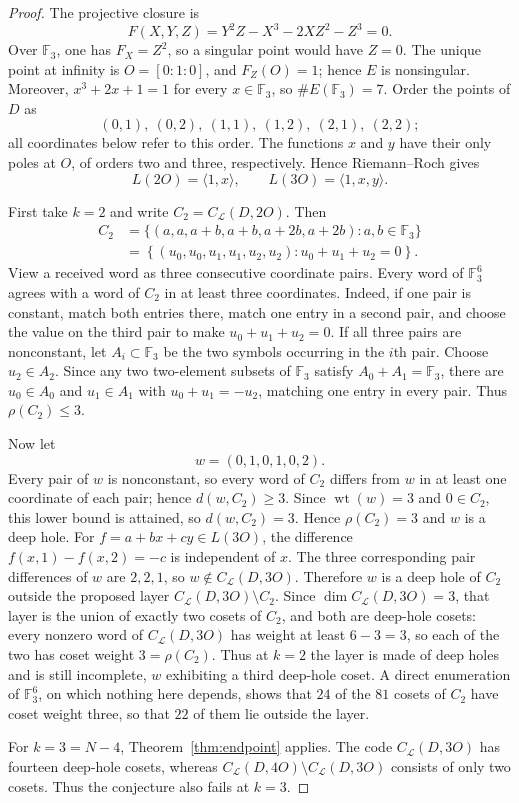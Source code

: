 \documentclass[11pt]{amsart}
\newcommand{\F}{\mathbb{F}}
\newcommand{\CL}{C_{\mathcal L}}
\begin{document}
\begin{proof}
The projective closure is
\[
  F(X,Y,Z)=Y^2Z-X^3-2XZ^2-Z^3=0.
\]
Over $\F_3$, one has $F_X=Z^2$, so a singular point would have $Z=0$.
The unique point at infinity is $O=[0:1:0]$, and $F_Z(O)=1$; hence $E$ is
nonsingular. Moreover, $x^3+2x+1=1$ for every $x\in\F_3$, so
$\#E(\F_3)=7$. Order the points of $D$ as
\[
  (0,1),\ (0,2),\ (1,1),\ (1,2),\ (2,1),\ (2,2);
\]
all coordinates below refer to this order.
The functions $x$ and $y$ have their only poles at
$O$, of orders two and three, respectively. Hence Riemann--Roch gives
\[
  L(2O)=\langle1,x\rangle,\qquad L(3O)=\langle1,x,y\rangle.
\]

First take $k=2$ and write $C_2=\CL(D,2O)$. Then
\begin{align*}
 C_2
 &=\{(a,a,a+b,a+b,a+2b,a+2b):a,b\in\F_3\}\\
 &=\left\{(u_0,u_0,u_1,u_1,u_2,u_2):
 u_0+u_1+u_2=0\right\}.
\end{align*}
View a received word as three consecutive coordinate pairs. Every word
of $\F_3^6$ agrees with a word of $C_2$ in at least three coordinates.
Indeed, if one pair is constant, match both entries there, match one
entry in a second pair, and choose the value on the third pair to make
$u_0+u_1+u_2=0$. If all three pairs are nonconstant, let
$A_i\subset\F_3$ be the two symbols occurring in the $i$th pair. Choose
$u_2\in A_2$. Since any two two-element subsets of $\F_3$ satisfy
$A_0+A_1=\F_3$, there are $u_0\in A_0$ and $u_1\in A_1$ with
$u_0+u_1=-u_2$, matching one entry in every pair. Thus $\rho(C_2)\le3$.

Now let
\[
  w=(0,1,0,1,0,2).
\]
Every pair of $w$ is nonconstant, so every word of $C_2$ differs from
$w$ in at least one coordinate of each pair; hence $d(w,C_2)\ge3$.
Since $\operatorname{wt}(w)=3$ and $0\in C_2$, this lower bound is
attained, so $d(w,C_2)=3$. Hence $\rho(C_2)=3$ and $w$ is a deep hole.
For $f=a+bx+cy\in L(3O)$, the difference
$f(x,1)-f(x,2)=-c$ is independent of $x$. The three corresponding pair
differences of $w$ are $2,2,1$, so $w\notin\CL(D,3O)$. Therefore $w$ is
a deep hole of $C_2$ outside the proposed layer
$\CL(D,3O)\setminus C_2$. Since $\dim\CL(D,3O)=3$, that layer is the
union of exactly two cosets of $C_2$, and both are deep-hole cosets:
every nonzero word of $\CL(D,3O)$ has weight at least $6-3=3$, so each of
the two has coset weight $3=\rho(C_2)$. Thus at $k=2$ the layer is made
of deep holes and is still incomplete, $w$ exhibiting a third deep-hole
coset. A direct enumeration of $\F_3^6$, on which nothing here depends,
shows that $24$ of the $81$ cosets of $C_2$ have coset weight three, so
that $22$ of them lie outside the layer.

For $k=3=N-4$, Theorem~\ref{thm:endpoint} applies. The code
$\CL(D,3O)$ has fourteen deep-hole cosets, whereas
$\CL(D,4O)\setminus\CL(D,3O)$ consists of only two cosets. Thus the
conjecture also fails at $k=3$.
\end{proof}
\end{document}
